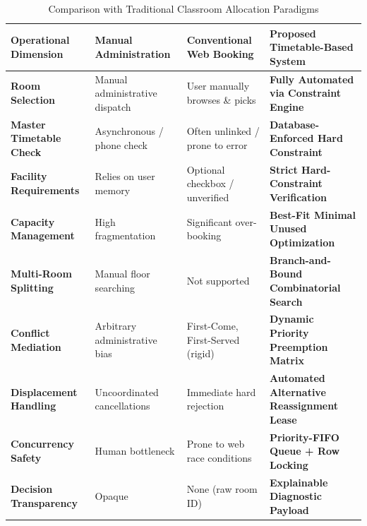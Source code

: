 \documentclass[conference]{IEEEtran}
\begin{document}
\begin{table}[t]
\caption{Comparison with Traditional Classroom Allocation Paradigms}
\label{tab:comparison}
\centering
\small
\begin{tabular}{p{3.2cm} p{3.6cm} p{4.5cm} p{5.0cm}}
\toprule
\textbf{Operational Dimension} & \textbf{Manual Administration} & \textbf{Conventional Web Booking} & \textbf{Proposed Timetable-Based System} \\
\midrule
\textbf{Room Selection} & Manual administrative dispatch & User manually browses \& picks & \textbf{Fully Automated via Constraint Engine} \\
\textbf{Master Timetable Check} & Asynchronous / phone check & Often unlinked / prone to error & \textbf{Database-Enforced Hard Constraint} \\
\textbf{Facility Requirements} & Relies on user memory & Optional checkbox / unverified & \textbf{Strict Hard-Constraint Verification} \\
\textbf{Capacity Management} & High fragmentation & Significant over-booking & \textbf{Best-Fit Minimal Unused Optimization} \\
\textbf{Multi-Room Splitting} & Manual floor searching & Not supported & \textbf{Branch-and-Bound Combinatorial Search} \\
\textbf{Conflict Mediation} & Arbitrary administrative bias & First-Come, First-Served (rigid) & \textbf{Dynamic Priority Preemption Matrix} \\
\textbf{Displacement Handling} & Uncoordinated cancellations & Immediate hard rejection & \textbf{Automated Alternative Reassignment Lease} \\
\textbf{Concurrency Safety} & Human bottleneck & Prone to web race conditions & \textbf{Priority-FIFO Queue + Row Locking} \\
\textbf{Decision Transparency} & Opaque & None (raw room ID) & \textbf{Explainable Diagnostic Payload} \\
\bottomrule
\end{tabular}
\end{table}
\end{document}
